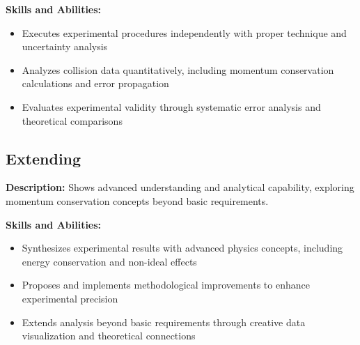 \documentclass[12pt]{article}
\begin{document}
\noindent\textbf{Skills and Abilities:}
\begin{itemize}[leftmargin=*]
    \item Executes experimental procedures independently with proper technique and uncertainty analysis
    \item Analyzes collision data quantitatively, including momentum conservation calculations and error propagation
    \item Evaluates experimental validity through systematic error analysis and theoretical comparisons
\end{itemize}

\subsection*{Extending}
\textbf{Description:} Shows advanced understanding and analytical capability, exploring momentum conservation concepts beyond basic requirements.

\noindent\textbf{Skills and Abilities:}
\begin{itemize}[leftmargin=*]
    \item Synthesizes experimental results with advanced physics concepts, including energy conservation and non-ideal effects
    \item Proposes and implements methodological improvements to enhance experimental precision
    \item Extends analysis beyond basic requirements through creative data visualization and theoretical connections
\end{itemize}
\end{document}
